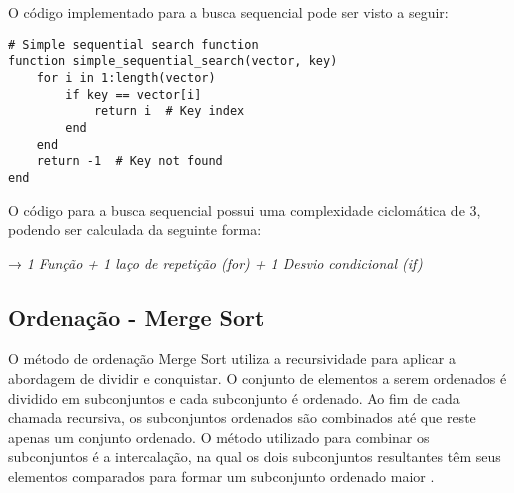 \documentclass[12pt]{article}
\begin{document}
    O código implementado para a busca sequencial pode ser visto a seguir:
    \begin{verbatim}
# Simple sequential search function
function simple_sequential_search(vector, key)
    for i in 1:length(vector)
        if key == vector[i]
            return i  # Key index
        end
    end
    return -1  # Key not found
end
    \end{verbatim}
    
    O código para a busca sequencial possui uma complexidade ciclomática de 3, podendo ser calculada da seguinte forma: 

    \begin{center}
        → \textit{1 Função + 1 laço de repetição (for) + 1 Desvio condicional (if)}
    \end{center}







\subsection{Ordenação - Merge Sort}
     O método de ordenação Merge Sort utiliza a recursividade para aplicar a abordagem de dividir e conquistar. O conjunto de elementos a serem ordenados é dividido em subconjuntos e cada subconjunto é ordenado. Ao fim de cada chamada recursiva, os subconjuntos ordenados são combinados até que reste apenas um conjunto ordenado. O método utilizado para combinar os subconjuntos é a intercalação, na qual os dois subconjuntos resultantes têm seus elementos comparados para formar um subconjunto ordenado maior \cite{cormen:2009}.



    
\end{document}

